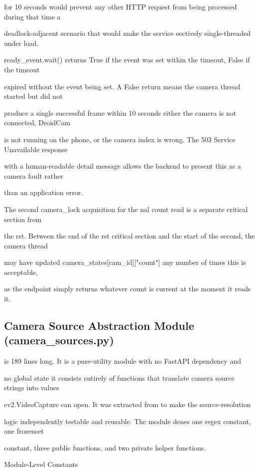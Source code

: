 for 10 seconds would prevent any other HTTP request from being processed during that time  a

deadlock-adjacent scenario that would make the service eectively single-threaded under load.

ready\_event.wait() returns True if the event was set within the timeout, False if the timeout

expired without the event being set. A False return means the camera thread started but did not

produce a single successful frame within 10 seconds  either the camera is not connected, DroidCam

is not running on the phone, or the camera index is wrong. The 503 Service Unavailable response

with a human-readable detail message allows the backend to present this as a camera fault rather

than an application error.

The second camera\_lock acquisition for the nal count read is a separate critical section from

the rst. Between the end of the rst critical section and the start of the second, the camera thread

may have updated camera\_states[cam\_id]["count"] any number of times  this is acceptable,

as the endpoint simply returns whatever count is current at the moment it reads it.


\subsection{Camera Source Abstraction Module (camera\_sources.py)}
is 189 lines long. It is a pure-utility module with no FastAPI dependency and

no global state  it consists entirely of functions that translate camera source strings into values

cv2.VideoCapture can open. It was extracted from to make the source-resolution

logic independently testable and reusable. The module denes one regex constant, one frozenset

constant, three public functions, and two private helper functions.

Module-Level Constants

